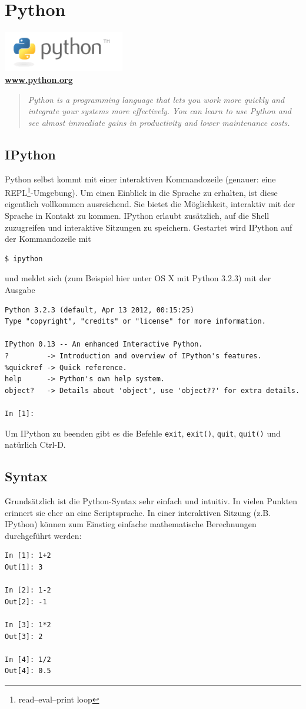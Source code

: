 \chapter{Python}
\begin{center}
    \includegraphics[width=200px]{img/python.png} \\
    \textbf{\href{http://python.org}{www.python.org}}
\end{center}
\begin{quote}
    \textit{Python is a programming language that lets you work more quickly and integrate your systems more effectively. You can learn to use Python and see almost immediate gains in productivity and lower maintenance costs.}
\end{quote}

\section{IPython}
Python selbst kommt mit einer interaktiven Kommandozeile (genauer: eine REPL\footnote{ read–eval–print loop}-Umgebung). Um einen Einblick in die Sprache zu erhalten, ist diese eigentlich vollkommen ausreichend. Sie bietet die Möglichkeit, interaktiv mit der Sprache in Kontakt zu kommen. IPython erlaubt zusätzlich, auf die Shell zuzugreifen und interaktive Sitzungen zu speichern.
Gestartet wird IPython auf der Kommandozeile mit
\begin{verbatim}
$ ipython
\end{verbatim}
und meldet sich (zum Beispiel hier unter OS X mit Python 3.2.3) mit der Ausgabe
\begin{verbatim}
Python 3.2.3 (default, Apr 13 2012, 00:15:25) 
Type "copyright", "credits" or "license" for more information.

IPython 0.13 -- An enhanced Interactive Python.
?         -> Introduction and overview of IPython's features.
%quickref -> Quick reference.
help      -> Python's own help system.
object?   -> Details about 'object', use 'object??' for extra details.

In [1]: 
\end{verbatim}
Um IPython zu beenden gibt es die Befehle \texttt{exit}, \texttt{exit()}, \texttt{quit}, \texttt{quit()} und natürlich Ctrl-D.

\section{Syntax}
Grundsätzlich ist die Python-Syntax sehr einfach und intuitiv. In vielen Punkten erinnert sie eher an eine Scriptsprache. In einer interaktiven Sitzung (z.B. IPython) können zum Einstieg einfache mathematische Berechnungen durchgeführt werden:
\begin{verbatim}
In [1]: 1+2
Out[1]: 3

In [2]: 1-2
Out[2]: -1

In [3]: 1*2
Out[3]: 2

In [4]: 1/2
Out[4]: 0.5
\end{verbatim}

